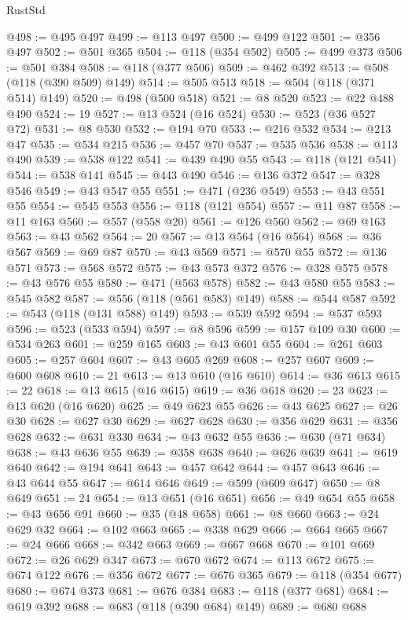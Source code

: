 \begin{lexlean}{RustStd}
\begin{coremodule}
@498 := @495 @497
@499 := @113 @497
@500 := @499 @122
@501 := @356 @497
@502 := @501 @365
@504 := @118 (@354 @502)
@505 := @499 @373
@506 := @501 @384
@508 := @118 (@377 @506)
@509 := @462 @392
@513 := @508 (@118 (@390 @509) @149)
@514 := @505 @513
@518 := @504 (@118 (@371 @514) @149)
@520 := @498 (@500 @518)
@521 := @8 @520
@523 := @22 @488 @490
@524 := 19
@527 := @13 @524 (@16 @524)
@530 := @523 (@36 @527 @72)
@531 := @8 @530
@532 := @194 @70
@533 := @216 @532
@534 := @213 @47
@535 := @534 @215
@536 := @457 @70
@537 := @535 @536
@538 := @113 @490
@539 := @538 @122
@541 := @439 @490 @55
@543 := @118 (@121 @541)
@544 := @538 @141
@545 := @443 @490
@546 := @136 @372
@547 := @328 @546
@549 := @43 @547 @55
@551 := @471 (@236 @549)
@553 := @43 @551 @55
@554 := @545 @553
@556 := @118 (@121 @554)
@557 := @11 @87
@558 := @11 @163
@560 := @557 (@558 @20)
@561 := @126 @560
@562 := @69 @163
@563 := @43 @562
@564 := 20
@567 := @13 @564 (@16 @564)
@568 := @36 @567
@569 := @69 @87
@570 := @43 @569
@571 := @570 @55
@572 := @136 @571
@573 := @568 @572
@575 := @43 @573 @372
@576 := @328 @575
@578 := @43 @576 @55
@580 := @471 (@563 @578)
@582 := @43 @580 @55
@583 := @545 @582
@587 := @556 (@118 (@561 @583) @149)
@588 := @544 @587
@592 := @543 (@118 (@131 @588) @149)
@593 := @539 @592
@594 := @537 @593
@596 := @523 (@533 @594)
@597 := @8 @596
@599 := @157 @109 @30
@600 := @534 @263
@601 := @259 @165
@603 := @43 @601 @55
@604 := @261 @603
@605 := @257 @604
@607 := @43 @605 @269
@608 := @257 @607
@609 := @600 @608
@610 := 21
@613 := @13 @610 (@16 @610)
@614 := @36 @613
@615 := 22
@618 := @13 @615 (@16 @615)
@619 := @36 @618
@620 := 23
@623 := @13 @620 (@16 @620)
@625 := @49 @623 @55
@626 := @43 @625
@627 := @26 @30
@628 := @627 @30
@629 := @627 @628
@630 := @356 @629
@631 := @356 @628
@632 := @631 @330
@634 := @43 @632 @55
@636 := @630 (@71 @634)
@638 := @43 @636 @55
@639 := @358 @638
@640 := @626 @639
@641 := @619 @640
@642 := @194 @641
@643 := @457 @642
@644 := @457 @643
@646 := @43 @644 @55
@647 := @614 @646
@649 := @599 (@609 @647)
@650 := @8 @649
@651 := 24
@654 := @13 @651 (@16 @651)
@656 := @49 @654 @55
@658 := @43 @656 @91
@660 := @35 (@48 @658)
@661 := @8 @660
@663 := @24 @629 @32
@664 := @102 @663
@665 := @338 @629
@666 := @664 @665
@667 := @24 @666
@668 := @342 @663
@669 := @667 @668
@670 := @101 @669
@672 := @26 @629 @347
@673 := @670 @672
@674 := @113 @672
@675 := @674 @122
@676 := @356 @672
@677 := @676 @365
@679 := @118 (@354 @677)
@680 := @674 @373
@681 := @676 @384
@683 := @118 (@377 @681)
@684 := @619 @392
@688 := @683 (@118 (@390 @684) @149)
@689 := @680 @688

\end{coremodule}
\end{lexlean}
